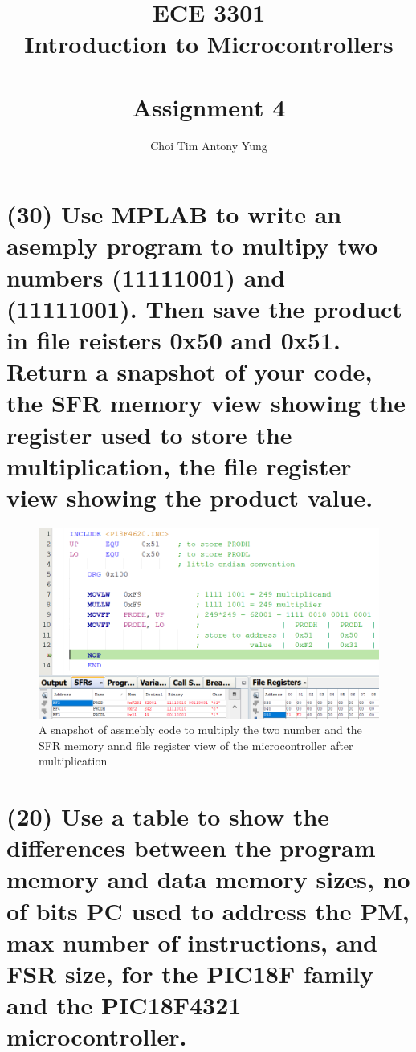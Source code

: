 \documentclass{article}
\title{ECE 3301\\Introduction to Microcontrollers\\\,\\Assignment 4}
\author{Choi Tim Antony Yung}
\begin{document}
\maketitle

\thispagestyle{empty}
\setcounter{page}{0}

\newpage

\section{(30) Use MPLAB to write an asemply program to multipy two numbers (11111001) and (11111001). Then save the product in file reisters 0x50 and 0x51. Return a snapshot of your code, the SFR memory view showing the register used to store the multiplication, the file register view showing the product value.}
\begin{figure}[H]
  \centering
  \includegraphics[width=\textwidth]{ECE3301_Assignment4.png}
  \caption{A snapshot of assmebly code to multiply the two number and the SFR memory annd file register view of the microcontroller after multiplication}
\end{figure}

\newpage

\section{(20) Use a table to show the differences between the program memory and data memory sizes, no of bits PC used to address the PM, max number of instructions, and FSR size, for the PIC18F family and the PIC18F4321 microcontroller.}
\end{document}
